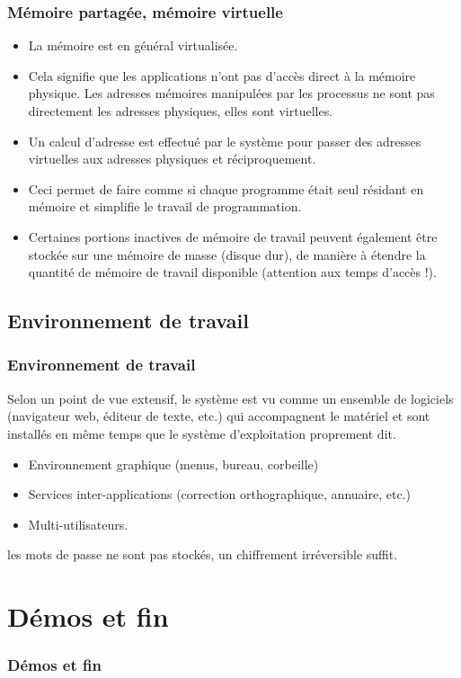 \documentclass[xcolor=svgnames]{beamer}
\begin{document}
\begin{frame}
  \frametitle{Mémoire partagée, mémoire virtuelle}
  \begin{itemize}
\item La mémoire est en général virtualisée. \pause
\item Cela signifie que les applications n'ont pas d'accès direct à la
  mémoire physique. Les adresses mémoires manipulées par les processus
  ne sont pas directement les adresses physiques, elles sont
  virtuelles.\pause
  \item Un calcul d'adresse est effectué par le système pour passer
    des adresses virtuelles aux adresses physiques et
    réciproquement.\pause 
  \item Ceci permet de faire comme si chaque programme était seul
    résidant en mémoire et simplifie le travail de programmation.\pause
  \item Certaines portions inactives de mémoire de travail peuvent
    également être stockée sur une mémoire de masse (disque dur), de
    manière à étendre la quantité de mémoire de
    travail disponible (attention aux \alert{temps d'accès} !).
  \end{itemize}
\end{frame}

\subsection{Environnement de travail}
\begin{frame}
  \frametitle{Environnement de travail}
  Selon un point de vue extensif, le système est vu comme un ensemble
  de logiciels (navigateur web, éditeur de texte, etc.)  qui
  accompagnent le matériel et sont installés en même temps que le
  système d'exploitation proprement dit.\pause
\begin{itemize}
\item Environnement graphique (menus, bureau, corbeille) \pause
\item Services inter-applications (correction orthographique, annuaire, etc.)\pause
\item Multi-utilisateurs.\pause 
\end{itemize}

 les mots de passe ne sont pas stockés, un chiffrement irréversible suffit.
\end{frame}


\section[Démos]{Démos et fin}
\begin{frame}
  \frametitle{Démos et fin}
\end{frame}
\end{document}
